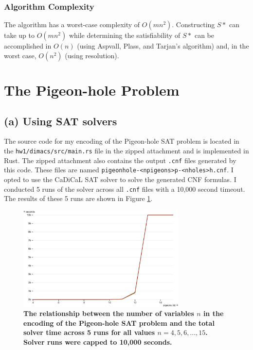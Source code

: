 \documentclass{article}
\newcommand{\code}[1]{\texttt{#1}}
\begin{document}
\subsubsection{Algorithm Complexity}

\noindent The algorithm has a worst-case complexity of $O(mn^2)$. Constructing $S*$ can take up to $O(mn^2)$ while determining the satisfiability of $S*$ can be accomplished in $O(n)$ (using Aspvall, Plass, and Tarjan's algorithm) and, in the worst case, $O(n^2)$ (using resolution).

\section{The Pigeon-hole Problem}

\subsection{(a) Using SAT solvers}

\noindent The source code for my encoding of the Pigeon-hole SAT problem is located in the \code{hw1/dimacs/src/main.rs} file in the zipped attachment and is implemented in Rust. The zipped attachment also contains the output \code{.cnf} files generated by this code. These files are named \code{pigeonhole-<npigeons>p-<nholes>h.cnf}. I opted to use the CaDiCaL SAT solver \cite{biere_cadical_2022} to solve the generated CNF formulas. I conducted 5 runs of the solver across all \code{.cnf} files with a 10,000 second timeout. The results of these 5 runs are shown in Figure \ref{fig:solver-times}.

\begin{figure}
  \centering
  \includegraphics[width=0.75\textwidth]{pigeon-hole}
  \caption{\textbf{The relationship between the number of variables $n$ in the encoding of the Pigeon-hole SAT problem and the total solver time across 5 runs for all values $n = 4, 5, 6,...,15$. Solver runs were capped to 10,000 seconds.}}
  \label{fig:solver-times}
\end{figure}
\end{document}
